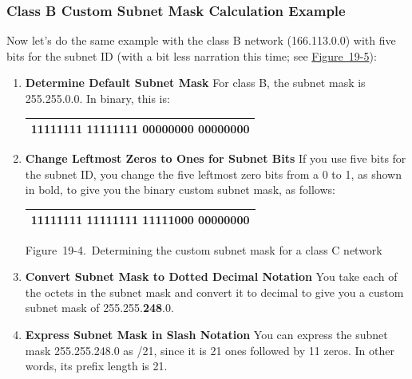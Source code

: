 \documentclass[b5paper,11pt]{memoir}
\begin{document}
\subsubsection[class B Custom Subnet Mask Calculation
Example]{\texorpdfstring{\protect\hypertarget{ch19s03.htmlux5cux23class_b_custom_subnet_mask_calculation_e}{}{}Class
B Custom Subnet Mask Calculation
Example}{class B Custom Subnet Mask Calculation Example}}

Now let's do the same example with the class B network (166.113.0.0)
with five bits for the subnet ID (with a bit less narration this time;
see
\protect\hyperlink{ch19s03.htmlux5cux23determining_the_custom_subnet_mask-id001}{Figure~19-5}):

\begin{enumerate}
\item
  {\textbf{Determine Default Subnet Mask}} For class B, the subnet mask
  is 255.255.0.0. In binary, this is:

  \begin{longtable}[]{@{}l@{}}
  \toprule
  \endhead
  11111111 11111111 00000000 00000000\tabularnewline
  \bottomrule
  \end{longtable}
\item
  {\textbf{Change Leftmost Zeros to Ones for Subnet Bits}} If you use
  five bits for the subnet ID, you change the five leftmost zero bits
  from a 0 to 1, as shown in bold, to give you the binary custom subnet
  mask, as follows:

  \begin{longtable}[]{@{}l@{}}
  \toprule
  \endhead
  11111111 11111111 {\textbf{11111}}000 00000000\tabularnewline
  \bottomrule
  \end{longtable}

  \protect\hypertarget{ch19s03.htmlux5cux23determining_the_custom_subnet_mask_for_a}{}{}

  \protect\hypertarget{ch19s03.htmlux5cux23I_mediaobject5_d1e20800}{}{}

  Figure~19-4.~Determining the custom subnet mask for a class C network
\item
  {\textbf{Convert Subnet Mask to Dotted Decimal Notation}} You take
  each of the octets in the subnet mask and convert it to decimal to
  give you a custom subnet mask of 255.255.{\textbf{248}}.0.
\item
  {\textbf{Express Subnet Mask in Slash Notation}} You can express the
  subnet mask 255.255.248.0 as /21, since it is 21 ones followed by 11
  zeros. In other words, its prefix length is 21.
\end{enumerate}
\end{document}
